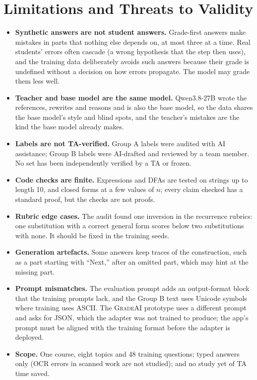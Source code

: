 \documentclass[11pt,a4paper]{article}
\newif\ifdraft
\newcommand{\todo}[2]{%
  \ifdraft\textcolor{red}{\textbf{[TODO #1:} #2\textbf{]}}\fi}
\newcommand{\gradeai}{\textsc{GradeAI}}
\theoremstyle{definition}
\begin{document}
\section{Limitations and Threats to Validity}\label{sec:limits}
\begin{itemize}[leftmargin=*,itemsep=2pt]
  \item \textbf{Synthetic answers are not student answers.} Grade-first answers make mistakes in parts that nothing else depends on, at most three at a time. Real students' errors often cascade (a wrong hypothesis that the step then uses), and the training data deliberately avoids such answers because their grade is undefined without a decision on how errors propagate. The model may grade them less well.
  \item \textbf{Teacher and base model are the same model.} Qwen3.8-27B wrote the references, rewrites and reasons and is also the base model, so the data shares the base model's style and blind spots, and the teacher's mistakes are the kind the base model already makes.
  \item \textbf{Labels are not TA-verified.} Group A labels were audited with AI assistance; Group B labels were AI-drafted and reviewed by a team member. No set has been independently verified by a TA or frozen.
  \item \textbf{Code checks are finite.} Expressions and DFAs are tested on strings up to length 10, and closed forms at a few values of $n$; every claim checked has a standard proof, but the checks are not proofs.
  \item \textbf{Rubric edge cases.} The audit found one inversion in the recurrence rubrics: one substitution with a correct general form scores below two substitutions with none. It should be fixed in the training seeds.
  \item \textbf{Generation artefacts.} Some answers keep traces of the construction, such as a part starting with ``Next,'' after an omitted part, which may hint at the missing part.
  \item \textbf{Prompt mismatches.} The evaluation prompt adds an output-format block that the training prompts lack, and the Group B text uses Unicode symbols where training uses ASCII. The \gradeai{} prototype uses a different prompt and asks for JSON, which the adapter was not trained to produce; the app's prompt must be aligned with the training format before the adapter is deployed.
  \item \textbf{Scope.} One course, eight topics and 48 training questions; typed answers only (OCR errors in scanned work are not studied); and no study yet of TA time saved.
\end{itemize}
\todo{}{Revise once results are final; add limitations found during the evaluation. Consult the ethics document.}
\end{document}
